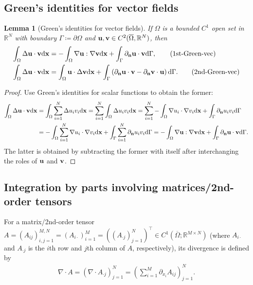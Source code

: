 \documentclass[oneside]{book}
\numberwithin{equation}{section}
\newtheorem{lemma}{Lemma}[section]
\begin{document}
\subsection{Green's identities for vector fields}
\begin{lemma}[Green's identities for vector fields]
    If $\Omega$ is a bounded $C^1$ open set in $\mathbb{R}^N$ with boundary $\Gamma\coloneqq\partial\Omega$ and ${\bf u},{\bf v}\in C^2(\overline{\Omega},\mathbb{R}^N)$, then
    \begin{align}
        \int_\Omega \Delta{\bf u}\cdot{\bf v}{\rm d}{\bf x} &= -\int_\Omega \nabla{\bf u}:\nabla{\bf v}{\rm d}{\bf x} + \int_\Gamma \partial_{\bf n}{\bf u}\cdot{\bf v}{\rm d}\Gamma,\label{Green's 1st identity vector}\tag{1st-Green-vec}\\
        \int_\Omega \Delta{\bf u}\cdot{\bf v}{\rm d}{\bf x} &= \int_\Omega {\bf u}\cdot\Delta{\bf v}{\rm d}{\bf x} + \int_\Gamma \left(\partial_{\bf n}{\bf u}\cdot{\bf v} - \partial_{\bf n}{\bf v}\cdot{\bf u}\right){\rm d}\Gamma.\label{Green's 2nd identity vector}\tag{2nd-Green-vec}
    \end{align}
\end{lemma}

\begin{proof}
    Use Green's identities for scalar functions to obtain the former:
    \begin{align*}
        \int_\Omega \Delta{\bf u}\cdot{\bf v}{\rm d}{\bf x} &= \int_\Omega \sum_{i=1}^N \Delta u_iv_i{\rm d}{\bf x} = \sum_{i=1}^N \int_\Omega \Delta u_iv_i{\rm d}{\bf x} = \sum_{i=1}^N -\int_\Omega \nabla u_i\cdot\nabla v_i{\rm d}{\bf x} + \int_\Gamma \partial_{\bf n}u_iv_i{\rm d}\Gamma\\
        &= -\int_\Omega \sum_{i=1}^N \nabla u_i\cdot\nabla v_i{\rm d}{\bf x} + \int_\Gamma \sum_{i=1}^N \partial_{\bf n}u_iv_i{\rm d}\Gamma = -\int_\Omega \nabla{\bf u}:\nabla{\bf v}{\rm d}{\bf x} + \int_\Gamma \partial_{\bf n}{\bf u}\cdot{\bf v}{\rm d}\Gamma.
    \end{align*}
    The latter is obtained by subtracting the former with itself after interchanging the roles of ${\bf u}$ and ${\bf v}$.
\end{proof}

\subsection{Integration by parts involving matrices/2nd-order tensors}
For a matrix/2nd-order tensor $A = (A_{ij})_{i,j=1}^{M,N} = (A_{i \cdot})_{i=1}^M = ((A_{\cdot j})_{j=1}^N)^\top\in C^1(\overline{\Omega};\mathbb{R}^{M\times N})$ (where $A_{i \cdot}$ and $A_{\cdot j}$ is the $i$th row and $j$th column of $A$, respectively), its divergence is defined by
\begin{align*}
    \nabla\cdot A = \left(\nabla\cdot A_{\cdot j}\right)_{j=1}^N = \left(\sum_{i=1}^M \partial_{x_i}A_{ij}\right)_{j=1}^N.
\end{align*}
\end{document}
